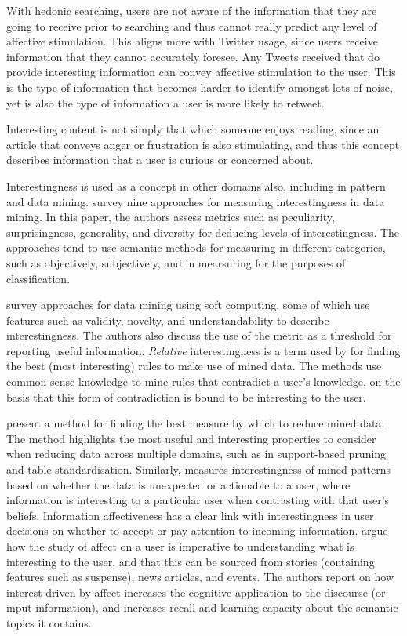 With hedonic searching, users are not aware of the information that they are going to receive prior to searching and thus cannot really predict any level of affective stimulation. This aligns more with Twitter usage, since users receive information that they cannot accurately foresee. Any Tweets received that do provide interesting information can convey affective stimulation to the user. This is the type of information that becomes harder to identify amongst lots of noise, yet is also the type of information a user is more likely to retweet.

Interesting content is not simply that which someone enjoys reading, since an article that conveys anger or frustration is also stimulating, and thus this concept describes information that a user is curious or concerned about. 

Interestingness is used as a concept in other domains also, including in pattern and data mining. \citet{geng06} survey nine approaches for measuring interestingness in data mining. In this paper, the authors assess metrics such as peculiarity, surprisingness, generality, and diversity for deducing levels of interestingness. The approaches tend to use semantic methods for measuring in different categories, such as objectively, subjectively, and in mearsuring for the purposes of classification.

\citet{mitra02} survey approaches for data mining using soft computing, some of which use features such as validity, novelty, and understandability to describe interestingness. The authors also discuss the use of the metric as a threshold for reporting useful information. \textit{Relative} interestingness is a term used by \citet{hussain00} for finding the best (most interesting) rules to make use of mined data. The methods use common sense knowledge to mine rules that contradict a user's knowledge, on the basis that this form of contradiction is bound to be interesting to the user. 

\citet{tan02} present a method for finding the best measure by which to reduce mined data. The method highlights the most useful and interesting properties to consider when reducing data across multiple domains, such as in support-based pruning and table standardisation. Similarly, \citet{silberschatz95} measures interestingness of mined patterns based on whether the data is unexpected or actionable to a user, where information is interesting to a particular user when contrasting with that user's beliefs. Information affectiveness has a clear link with interestingness in user decisions on whether to accept or pay attention to incoming information. \citet{hidi86} argue how the study of affect on a user is imperative to understanding what is interesting to the user, and that this can be sourced from stories (containing features such as suspense), news articles, and events. The authors report on how interest driven by affect increases the cognitive application to the discourse (or input information), and increases recall and learning capacity about the semantic topics it contains.

